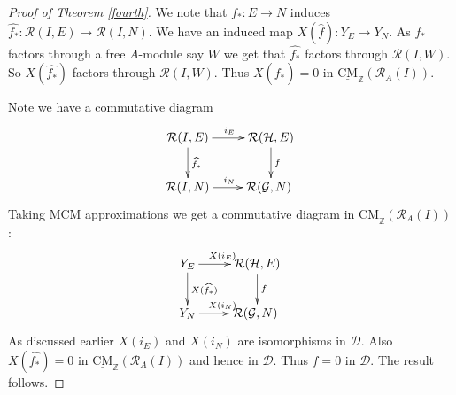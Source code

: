 \documentclass[10pt,a4paper]{amsart}
\newcommand{\CMS}{\operatorname{\underline{CM}}}
\newcommand{\D}{\mathcal{D} }
\newcommand{\Gc}{\mathcal{G} }
\newcommand{\Hc}{\mathcal{H} }
\newcommand{\Z}{\mathbb{Z} }
\newcommand{\eR}{\mathcal{R} }
\newcommand{\rt}{\rightarrow}
\newcommand{\wh}{\widehat }
\begin{document}
\begin{proof}[Proof of Theorem \ref{fourth}]
We note that $f_* \colon E \rt N$ induces $\wh{f_*} \colon \eR(I, E) \rt \eR(I, N)$. We have an induced map $X(\wh{f}) \colon Y_E \rt Y_N$. As $f_*$ factors through a free $A$-module say $W$ we get that $\wh{f_*}$ factors through $\eR(I, W)$. So $X(\wh{f_*}) $ factors through $\eR(I, W)$. Thus $X(\wh{f_*}) = 0$ in $\CMS_\Z(\eR_A(I))$.

Note we have a commutative diagram
\[
  \xymatrix
{
 \eR(I,E)
\ar@{->}[r]^{i_E}
\ar@{->}[d]^{\wh{f_*}}
 & \eR(\Hc, E)
\ar@{->}[d]^{f}
\\
 \eR(I, N)
 \ar@{->}[r]^{i_N}
 & \eR(\Gc, N)
\
 }
\]
Taking MCM approximations we get a commutative diagram in $\CMS_\Z(\eR_A(I))$:
\[
  \xymatrix
{
 Y_E
\ar@{->}[r]^{X(i_E)}
\ar@{->}[d]^{X(\wh{f_*})}
 & \eR(\Hc, E)
\ar@{->}[d]^{f}
\\
 Y_N
 \ar@{->}[r]^{X(i_N)}
 & \eR(\Gc, N)
\
 }
\]
As discussed earlier $X(i_E)$ and $X(i_N)$ are isomorphisms in $\D$. Also $X(\wh{f_*}) = 0$ in $\CMS_\Z(\eR_A(I))$ and hence in $\D$. Thus $f = 0$ in $\D$. The result follows.
\end{proof}
\end{document}
